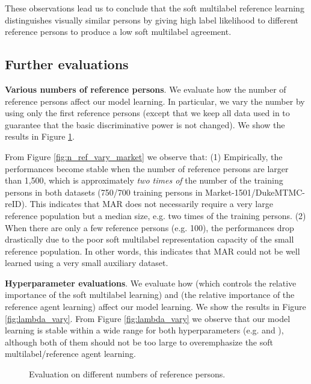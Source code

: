 \documentclass[10pt,twocolumn,letterpaper]{article}
\newcommand{\Koven}{\color{black}}
\begin{document}
These observations lead us to conclude that the soft multilabel reference learning
distinguishes visually similar persons by giving high label likelihood to different reference persons
to produce a low soft multilabel agreement.


\subsection{Further evaluations}\label{sec:further}

\noindent
\textbf{Various numbers of reference persons}.
We evaluate how the number of reference persons affect our model learning.
In particular, we vary the number by using only the first  reference persons
(except that we keep all data used in  to guarantee that the basic discriminative power is not changed).
We show the results in Figure \ref{fig:n_ref_vary}.

{\Koven
From Figure \ref{fig:n_ref_vary_market} we observe that:
(1) Empirically, the performances become stable when the number of reference persons are larger than 1,500, which is approximately \emph{two times of} the number of the training persons in both datasets (750/700 training persons in Market-1501/DukeMTMC-reID).
This indicates that MAR does not necessarily require a very large reference population but a median size, e.g. two times of the training persons.
(2) When there are only a few reference persons (e.g. 100),
the performances drop drastically due to the poor soft multilabel representation capacity of the small reference population.
In other words, this indicates that MAR could not be well learned using a very small auxiliary dataset.
}



\vspace{0.1cm}
\noindent
\textbf{Hyperparameter evaluations}.
We evaluate how  (which controls the relative importance of the soft multilabel learning)
and  (the relative importance of the reference agent learning) affect our model learning.
We show the results in Figure \ref{fig:lambda_vary}.
From Figure \ref{fig:lambda_vary} we observe that
our model learning is stable within a wide range for both hyperparameters
(e.g.  and ),
although both of them should not be too large to overemphasize the soft multilabel/reference agent learning.


\begin{figure}[t]
\begin{center}
\vspace{-0.4cm}
\end{center}
   \caption{Evaluation on different numbers of reference persons.
   }
\label{fig:n_ref_vary}
\vspace{-0.4cm}
\end{figure}
\end{document}
